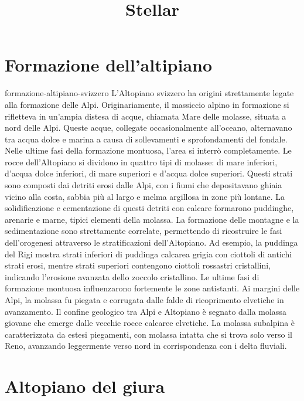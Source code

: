 \documentclass[preview]{standalone}
\begin{document}
\title{Stellar}
\genpage

\section{Formazione dell'altipiano}

\begin{snippet}{formazione-altipiano-svizzero}
    L'Altopiano svizzero ha origini strettamente legate alla formazione delle Alpi. Originariamente, il
    massiccio alpino in formazione si rifletteva in un'ampia distesa di acque, chiamata Mare delle
    molasse, situata a nord delle Alpi. Queste acque, collegate occasionalmente all'oceano,
    alternavano tra acqua dolce e marina a causa di sollevamenti e sprofondamenti del fondale. Nelle
    ultime fasi della formazione montuosa, l'area si interrò completamente. Le rocce dell'Altopiano si
    dividono in quattro tipi di molasse: di mare inferiori, d'acqua dolce inferiori, di mare superiori e
    d'acqua dolce superiori. Questi strati sono composti dai detriti erosi dalle Alpi, con i fiumi che
    depositavano ghiaia vicino alla costa, sabbia più al largo e melma argillosa in zone più lontane. La
    solidificazione e cementazione di questi detriti con calcare formarono puddinghe, arenarie e
    marne, tipici elementi della molassa. La formazione delle montagne e la sedimentazione sono
    strettamente correlate, permettendo di ricostruire le fasi dell'orogenesi attraverso le stratificazioni
    dell'Altopiano. Ad esempio, la puddinga del Rigi mostra strati inferiori di puddinga calcarea grigia
    con ciottoli di antichi strati erosi, mentre strati superiori contengono ciottoli rossastri cristallini,
    indicando l'erosione avanzata dello zoccolo cristallino. Le ultime fasi di formazione montuosa
    influenzarono fortemente le zone antistanti. Ai margini delle Alpi, la molassa fu piegata e corrugata
    dalle falde di ricoprimento elvetiche in avanzamento. Il confine geologico tra Alpi e Altopiano è
    segnato dalla molassa giovane che emerge dalle vecchie rocce calcaree elvetiche. La molassa
    subalpina è caratterizzata da estesi piegamenti, con molassa intatta che si trova solo verso il Reno,
    avanzando leggermente verso nord in corrispondenza con i delta fluviali.
\end{snippet}

\section{Altopiano del giura}
\end{document}
